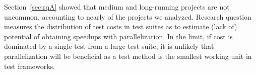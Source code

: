 Section~\ref{sec:rqA} showed that medium and long-running projects are
not uncommon, accounting to nearly \percentMedLongRunning{} of the
\numSubjs{} projects we analyzed.  Research question \numRQFeasibilityTwo{}
measures the distribution of test costs in test suites as to estimate
(lack of) potential of obtaining speedups with parallelization.  In
the limit, if cost is dominated by a single test from a large test
suite, it is unlikely that parallelization will be beneficial as a
test method is the smallest working unit in test frameworks.




